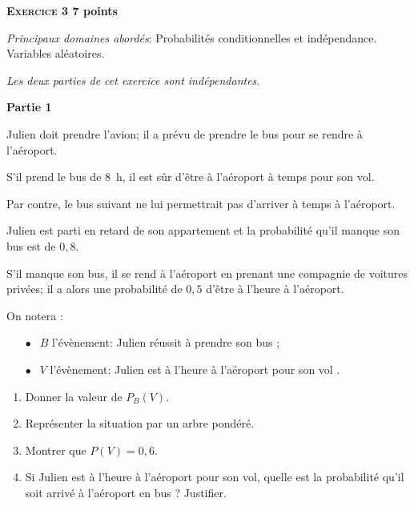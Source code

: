 \documentclass[11pt]{article}
\begin{document}
\bigskip

\textbf{\textsc{Exercice 3} \hfill 7 points}

\medskip

\emph{Principaux domaines abordés}: Probabilités conditionnelles et indépendance. Variables aléatoires.

\medskip

\begin{center}\emph{Les deux parties de cet exercice sont indépendantes.}\end{center}

\textbf{Partie 1}

\medskip

Julien doit prendre l'avion; il a prévu de prendre le bus pour se rendre à l'aéroport. 

S'il prend le bus de $8$~h, il est sûr d'être à l'aéroport à temps pour son vol.

Par contre, le bus suivant ne lui permettrait pas d'arriver à temps à l'aéroport.

Julien est parti en retard de son appartement et la probabilité qu'il manque son bus est de $0,8$.

S'il manque son bus, il se rend à l'aéroport en prenant une compagnie de voitures privées; il a alors une probabilité de $0,5$ d'être à l'heure à l'aéroport.

\smallskip

On notera :

\setlength\parindent{12mm}
\begin{itemize}
\item[$\bullet~~$] $B$ l'évènement: \og Julien réussit à prendre son bus \fg ;
\item[$\bullet~~$] $V$ l'évènement: \og Julien est à l'heure à l'aéroport pour son vol \fg.
\end{itemize}
\setlength\parindent{0mm}

\medskip

\begin{enumerate}
\item Donner la valeur de $P_B(V)$.
\item Représenter la situation par un arbre pondéré.
\item Montrer que $P(V) = 0,6$.
\item Si Julien est à l'heure à l'aéroport pour son vol, quelle est la probabilité qu'il soit arrivé à l'aéroport en bus ? Justifier.
\end{enumerate}

\bigskip
\end{document}
